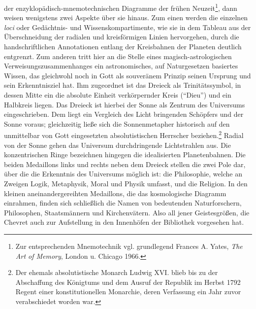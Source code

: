 der enzyklopädisch-mnemotechnischen Diagramme der frühen
Neuzeit\footnote{Zur entsprechenden Mnemotechnik vgl. grundlegend
  Frances A. Yates, \emph{The Art of Memory}, London u. Chicago 1966.},
dann weisen wenigstens zwei Aspekte über sie hinaus. Zum einen werden
die einzelnen \emph{loci} oder Gedächtnis- und Wissenskompartimente, wie
sie in dem Tableau aus der Überschneidung der radialen und kreisförmigen
Linien hervorgehen, durch die handschriftlichen Annotationen entlang der
Kreisbahnen der Planeten deutlich entgrenzt. Zum anderen tritt hier an
die Stelle eines magisch-astrologischen Verweisungszusammenhanges ein
astronomisches, auf Naturgesetzen basiertes Wissen, das gleichwohl noch
in Gott als souveränem Prinzip seinen Ursprung und sein Erkenntnisziel
hat. Ihm zugeordnet ist das Dreieck als Trinitätssymbol, in dessen Mitte
ein die absolute Einheit verkörpernder Kreis (\enquote{Dieu}) und ein
Halbkreis liegen. Das Dreieck ist hierbei der Sonne als Zentrum des
Universums eingeschrieben. Dem liegt ein Vergleich des Licht bringenden
Schöpfers und der Sonne voraus; gleichzeitig ließe sich die
Sonnenmetapher historisch auf den unmittelbar von Gott eingesetzten
absolutistischen Herrscher beziehen.\footnote{Der ehemals
  absolutistische Monarch Ludwig XVI. blieb bis zu der Abschaffung des
  Königtums und dem Ausruf der Republik im Herbst 1792 Regent einer
  konstitutionellen Monarchie, deren Verfassung ein Jahr zuvor
  verabschiedet worden war.} Radial von der Sonne gehen das Universum
durchdringende Lichtstrahlen aus. Die konzentrischen Ringe bezeichnen
hingegen die idealisierten Planetenbahnen. Die beiden Medaillons links
und rechts neben dem Dreieck stellen die zwei Pole dar, über die die
Erkenntnis des Universums möglich ist: die Philosophie, welche an
Zweigen Logik, Metaphysik, Moral und Physik umfasst, und die Religion.
In den kleinen aneinandergereihten Medaillons, die das kosmologische
Diagramm einrahmen, finden sich schließlich die Namen von bedeutenden
Naturforschern, Philosophen, Staatsmännern und Kirchenvätern. Also all
jener Geistesgrößen, die Chevret auch zur Aufstellung in den Innenhöfen
der Bibliothek vorgesehen hat.

